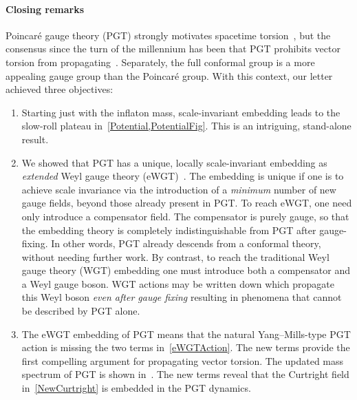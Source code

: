 \documentclass[aps,prd,reprint,preprintnumbers,showpacs,floatfix,nofootinbib,superscript address]{revtex4-2}
\begin{document}
\paragraph*{Closing remarks} Poincar\'e gauge theory (PGT) strongly motivates spacetime torsion~\cite{Utiyama:1956sy,Kibble:1961ba,Sciama:1962}, but the consensus since the turn of the millennium has been that PGT prohibits vector torsion from propagating~\cite{Hecht:1996np,Chen:1998ad,Yo:1999ex,Yo:2001sy,Yo:2006qs,Shie:2008ms,Chen:2009at,Baekler:2010fr,Ho:2011qn,Ho:2011xf,Ho:2015ulu,Tseng:2018feo,Zhang:2019mhd,Zhang:2019xek,MaldonadoTorralba:2020mbh,delaCruzDombriz:2021nrg}. Separately, the full conformal group is a more appealing gauge group than the Poincar\'e group. With this context, our letter achieved three objectives:
\begin{enumerate}
	\item Starting just with the inflaton mass, scale-invariant embedding leads to the slow-roll plateau in~\cref{Potential,PotentialFig}. This is an intriguing, stand-alone result.
	\item We showed that PGT has a unique, locally scale-invariant embedding as \emph{extended} Weyl gauge theory (eWGT)~\cite{Lasenby:2015dba,Hobson:2020bms,Hobson:2020doi,Hobson:2021iwy,Hobson:2023rdw}. The embedding is unique if one is to achieve scale invariance via the introduction of a \emph{minimum} number of new gauge fields, beyond those already present in PGT. To reach eWGT, one need only introduce a compensator field. The compensator is purely gauge, so that the embedding theory is completely indistinguishable from PGT after gauge-fixing. In other words, PGT already descends from a conformal theory, without needing further work. By contrast, to reach the traditional Weyl gauge theory (WGT) embedding one must introduce both a compensator and a Weyl gauge boson. WGT actions may be written down which propagate this Weyl boson \emph{even after gauge fixing} resulting in phenomena that cannot be described by PGT alone. 
	\item The eWGT embedding of PGT means that the natural Yang--Mills-type PGT action is missing the two terms in~\cref{eWGTAction}. The new terms provide the first compelling argument for propagating vector torsion. The updated mass spectrum of PGT is shown in~. The new terms reveal that the Curtright field in~\cref{NewCurtright} is embedded in the PGT dynamics.
\end{enumerate}
\end{document}
